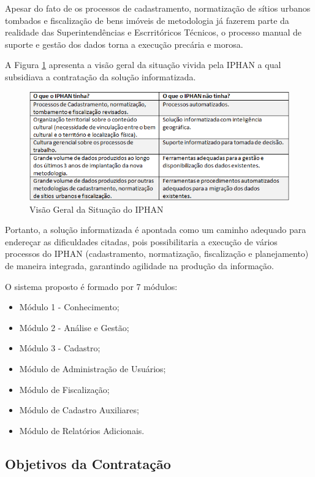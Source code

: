 Apesar do fato de os processos de cadastramento, normatização de sítios urbanos tombados e fiscalização de bens imóveis de metodologia já fazerem parte da realidade das Superintendências e Escrritóricos Técnicos, o processo manual de suporte e gestão dos dados torna a execução precária e morosa.

A Figura \ref{problemas}  apresenta a visão geral da situação vivida pela IPHAN a qual subsidiava a contratação da solução informatizada.

\begin{figure}[H]
		\centering
			\includegraphics[scale=1.0]{figuras/problemas.png}
		\caption{Visão Geral da Situação do IPHAN}
		\label{problemas}
\end{figure}

Portanto, a solução informatizada é apontada como um caminho adequado para endereçar as dificuldades citadas, pois possibilitaria a execução de vários processos do IPHAN (cadastramento, normatização, fiscalização e planejamento) de maneira integrada, garantindo agilidade na produção da informação. 

O sistema proposto é formado por 7 módulos:

\begin{itemize}
\item Módulo 1 - Conhecimento;
\item Módulo 2 - Análise e Gestão;
\item Módulo 3 - Cadastro;
\item Módulo de Administração de Usuários;
\item Módulo de Fiscalização;
\item Módulo de Cadastro Auxiliares;
\item Módulo de Relatórios Adicionais.
\end{itemize}

\subsection[Objetivos da Contratação]{Objetivos da Contratação}

